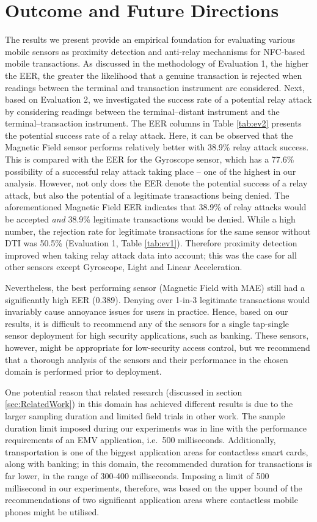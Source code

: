 \documentclass[runningheads,a4paper]{llncs}
\begin{document}
\section{Outcome and Future Directions}
\label{sec:OutcomeandFutureDirections}

The results we present provide an empirical foundation for evaluating various mobile sensors as proximity detection and anti-relay mechanisms for NFC-based mobile transactions. As discussed in the methodology of Evaluation 1, the higher the EER, the greater the likelihood that a genuine transaction is rejected when readings between the terminal and transaction instrument are considered.  Next, based on Evaluation 2, we investigated the success rate of a potential relay attack by considering readings between the terminal--distant instrument and the terminal--transaction instrument. The EER columns in Table \ref{tab:ev2} presents the potential success rate of a relay attack.  Here, it can be observed that the Magnetic Field sensor performs relatively better with 38.9\% relay attack success.  This is compared with the EER for the Gyroscope sensor, which has a 77.6\% possibility of a successful relay attack taking place -- one of the highest in our analysis.  However, not only does the EER denote the potential success of a relay attack, but also the potential of a legitimate transactions being denied.  The aforementioned Magnetic Field EER indicates that 38.9\% of relay attacks would be accepted \emph{and} 38.9\% legitimate transactions would be denied.  While a high number, the rejection rate for legitimate transactions for the same sensor without DTI was 50.5\% (Evaluation 1, Table \ref{tab:ev1}).  Therefore proximity detection improved when taking relay attack data into account; this was the case for all other sensors except Gyroscope, Light and Linear Acceleration.

Nevertheless, the best performing sensor (Magnetic Field with MAE) still had a significantly high EER (0.389).  Denying over 1-in-3 legitimate transactions would invariably cause annoyance issues for users in practice.  Hence, based on our results, it is difficult to recommend any of the sensors for a single tap-single sensor deployment for high security applications, such as banking.  These sensors, however, might be appropriate for low-security access control, but we recommend that a thorough analysis of the sensors and their performance in the chosen domain is performed prior to deployment.

One potential reason that related research (discussed in section \ref{sec:RelatedWork}) in this domain has achieved different results is due to the larger sampling duration and limited field trials in other work.  The sample duration limit imposed during our experiments was in line with the performance requirements of an EMV application, i.e.\ 500 milliseconds.  Additionally, transportation is one of the biggest application areas for contactless smart cards, along with banking; in this domain, the recommended duration for  transactions is far lower, in the range of 300-400 milliseconds.  Imposing a limit of 500 millisecond in our experiments, therefore, was based on the upper bound of the recommendations of two significant application areas where contactless mobile phones might be utilised. 
\end{document}
